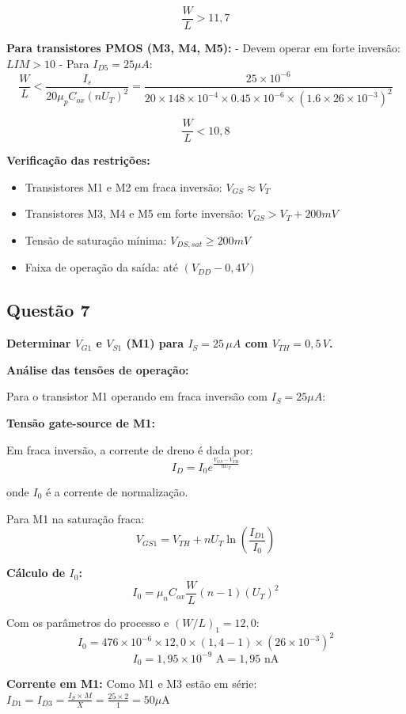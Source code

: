 ﻿\documentclass[12pt,a4paper]{article}
\begin{document}
$$\frac{W}{L} > 11,7$$

\textbf{Para transistores PMOS (M3, M4, M5):}
- Devem operar em forte inversão: $LIM > 10$
- Para $I_{D5} = 25\mu A$:
$$\frac{W}{L} < \frac{I_s}{20\mu_p C_{ox} (nU_T)^2} = \frac{25 \times 10^{-6}}{20 \times 148 \times 10^{-4} \times 0.45 \times 10^{-6} \times (1.6 \times 26 \times 10^{-3})^2}$$

$$\frac{W}{L} < 10,8$$

\textbf{Verificação das restrições:}
\begin{itemize}
    \item Transistores M1 e M2 em fraca inversão: $V_{GS} \approx V_T$
    \item Transistores M3, M4 e M5 em forte inversão: $V_{GS} > V_T + 200mV$
    \item Tensão de saturação mínima: $V_{DS,sat} \geq 200mV$
    \item Faixa de operação da saída: até $(V_{DD} - 0,4V)$
\end{itemize}

\subsection*{Questão 7}
	\textbf{Determinar $V_{G1}$ e $V_{S1}$ (M1) para $I_S = 25\,\mu A$ com $V_{TH} = 0{,}5\,V$.}

\textbf{Análise das tensões de operação:}

Para o transistor M1 operando em fraca inversão com $I_S = 25 \mu A$:

\textbf{Tensão gate-source de M1:}

Em fraca inversão, a corrente de dreno é dada por:
$$I_D = I_0 e^{\frac{V_{GS} - V_{TH}}{nU_T}} $$

onde $I_0$ é a corrente de normalização.

Para M1 na saturação fraca:
$$V_{GS1} = V_{TH} + nU_T \ln\left(\frac{I_{D1}}{I_0}\right) $$

\textbf{Cálculo de $I_0$:}
$$I_0 = \mu_n C_{ox} \frac{W}{L} (n-1)(U_T)^2 $$

Com os parâmetros do processo e $(W/L)_1 = 12,0$:
$$I_0 = 476 \times 10^{-6} \times 12,0 \times (1,4-1) \times (26 \times 10^{-3})^2$$
$$I_0 = 1,95 \times 10^{-9} \text{ A} = 1,95 \text{ nA}$$

\textbf{Corrente em M1:}
Como M1 e M3 estão em série: $I_{D1} = I_{D3} = \frac{I_S \times M}{X} = \frac{25 \times 2}{1} = 50 \mu\text{A}$
\end{document}
